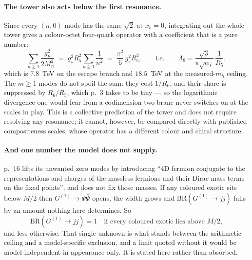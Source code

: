 \paragraph{The tower also acts below the first resonance.} Since every $(n,0)$ mode has the same
$\sqrt2$ at $x_5=0$, integrating out the whole tower gives a colour-octet four-quark operator with
a coefficient that is a pure number:
\begin{equation}\label{eq:tower}
  \sum_{n\ge1}\frac{g_n^2}{2M_n^2}
  \;=\;g_s^2R_5^2\sum_{n\ge1}\frac{1}{n^2}
  \;=\;\frac{\pi^2}{6}\,g_s^2R_5^2 ,
  \qquad\text{i.e.}\qquad
  \Lambda_8=\frac{\sqrt3}{\pi\sqrt{\alpha_s}}\,\frac{1}{R_5},
\end{equation}
which is $7.8$~TeV on the escape branch and $18.5$~TeV at the measured-$m_h$ ceiling. The $m\ge1$
modes do not spoil the sum: they cost $1/R_6$, and their share is suppressed by $R_6/R_5$, which
\cite{KM25} p.~3 takes to be tiny --- so the logarithmic divergence one would fear from a
codimension-two brane never switches on at the scales in play. This is a collective prediction of
the tower and does not require resolving any resonance; it cannot, however, be compared directly
with published compositeness scales, whose operator has a different colour and chiral structure.

\paragraph{And one number the model does not supply.} \cite{KM25} p.~16 lifts its unwanted zero
modes by introducing ``4D fermion conjugate to the representations and charges of the massless
fermions and their Dirac mass terms on the fixed points'', and does not fix those masses. If any
coloured exotic sits below $M/2$ then $G^{(1)}\to\Psi\bar\Psi$ opens, the width grows and
$\mathrm{BR}(G^{(1)}\to jj)$ falls by an amount nothing here determines. So
\begin{equation}\label{eq:brhole}
  \mathrm{BR}(G^{(1)}\to jj)=1 \quad\text{if every coloured exotic lies above } M/2,
\end{equation}
and less otherwise. That single unknown is what stands between the arithmetic ceiling and a
model-specific exclusion, and a limit quoted without it would be model-independent in appearance
only. It is stated here rather than absorbed.


